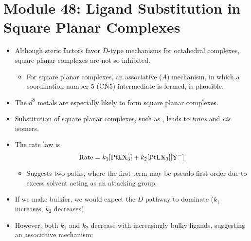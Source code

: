 \documentclass[../notes.tex]{subfiles}
\begin{document}
\section{Module 48: Ligand Substitution in Square Planar Complexes}
\begin{itemize}
    \item Although steric factors favor $D$-type mechanisms for octahedral complexes, square planar  complexes are not so inhibited.
    \begin{itemize}
        \item For square planar  complexes, an associative ($A$) mechanism, in which a coordination number 5 (CN5) intermediate is formed, is plausible.
    \end{itemize}
    \item The $d^8$ metals are especially likely to form square planar complexes.
    \item Substitution of square planar complexes, such as , leads to \emph{trans} and \emph{cis} isomers.
    \item The rate law is
    \begin{equation*}
        \text{Rate} = k_1\ce{[PtLX3]}+k_2\ce{[PtLX3][Y^-]}
    \end{equation*}
    \begin{itemize}
        \item Suggests two paths, where the first term may be pseudo-first-order due to excess solvent acting as an attacking group.
    \end{itemize}
    \item If we make  bulkier, we would expect the $D$ pathway to dominate ($k_1$ increases, $k_2$ decreases).
    \item However, both $k_1$ and $k_2$ decrease with increasingly bulky ligands, suggesting an associative mechanism:

\end{itemize}
\end{document}
